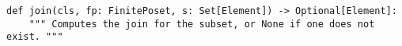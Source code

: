 \begin{verbatim}
def join(cls, fp: FinitePoset, s: Set[Element]) -> Optional[Element]:
    """ Computes the join for the subset, or None if one does not exist. """
\end{verbatim}
